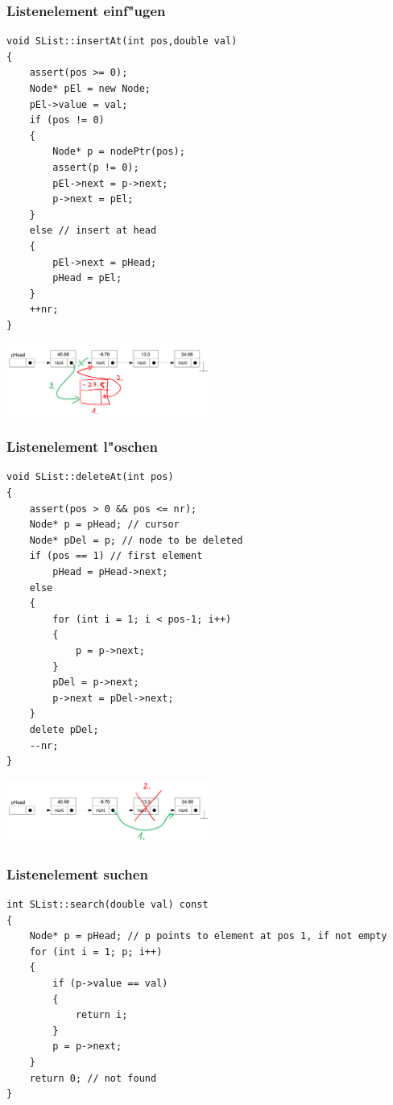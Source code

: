\subsubsection{Listenelement einf"ugen}
\begin{lstlisting}[style=C]
void SList::insertAt(int pos,double val)
{
	assert(pos >= 0);
	Node* pEl = new Node;
	pEl->value = val;
	if (pos != 0)
	{
		Node* p = nodePtr(pos);
		assert(p != 0);
		pEl->next = p->next;
		p->next = pEl;
	}
	else // insert at head
	{
		pEl->next = pHead;
		pHead = pEl;
	}
	++nr;
}
\end{lstlisting}
\begin{flushleft}
{\includegraphics[width=0.5\textwidth]{images/Listen/SLL_Insert.png}}
\label{Fig: Element bei SLL einf"ugen}
\end{flushleft}

\subsubsection{Listenelement l"oschen}
\begin{lstlisting}[style=C]
void SList::deleteAt(int pos)
{
	assert(pos > 0 && pos <= nr);
	Node* p = pHead; // cursor
	Node* pDel = p; // node to be deleted
	if (pos == 1) // first element
		pHead = pHead->next;
	else
	{
		for (int i = 1; i < pos-1; i++)
		{
			p = p->next;
		}
		pDel = p->next;
		p->next = pDel->next;
	}
	delete pDel;
	--nr;
}
\end{lstlisting}
\begin{flushleft}
{\includegraphics[width=0.5\textwidth]{images/Listen/SLL_Delete.png}}
\label{Fig: Element bei SLL l"oschen}
\end{flushleft}

\subsubsection{Listenelement suchen}
\begin{lstlisting}[style=C]
int SList::search(double val) const
{
	Node* p = pHead; // p points to element at pos 1, if not empty
	for (int i = 1; p; i++)
	{
		if (p->value == val)
		{
			return i;
		}
		p = p->next;
	}
	return 0; // not found
}
\end{lstlisting}



